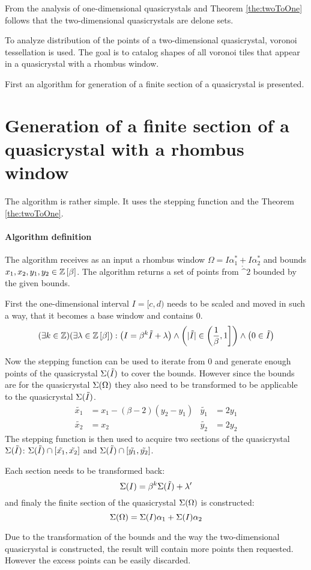 \documentclass[text.tex]{subfiles}
\begin{document}
From the analysis of one-dimensional quasicrystals and Theorem \ref{the:twoToOne} follows that the two-dimensional quasicrystals are delone sets.  

To analyze distribution of the points of a two-dimensional quasicrystal, voronoi tessellation is used. The goal is to catalog shapes of all voronoi tiles that appear in a quasicrystal with a rhombus window. 

First an algorithm for generation of a finite section of a quasicrystal is presented. 

\section{Generation of a finite section of a quasicrystal with a rhombus window}
The algorithm is rather simple. It uses the stepping function and the Theorem \ref{the:twoToOne}. 

\paragraph{Algorithm definition} The algorithm receives as an input a rhombus window $\Omega = I\alpha_1^\ast + I\alpha_2^\ast$ and bounds $x_1, x_2, y_1, y_2 \in \mathbb{Z}\left[\beta\right]$.
The algorithm returns a set of points from $\ring^2$ bounded by the given bounds.

First the one-dimensional interval $I = [c,d)$ needs to be scaled and moved in such a way, that it becomes a base window and contains $0$.
$$(\exists k\in\mathbb{Z})(\exists \lambda\in\mathbb{Z}\left[\beta\right]) : \left(I = \beta^k\tilde{I}+\lambda\right) \wedge \left(|\tilde{I}| \in \left(\frac{1}{\beta},1\right] \right)\wedge \left(0\in\tilde{I}\right)$$

Now the stepping function can be used to iterate from 0 and generate enough points of the quasicrystal $\Sigma(\tilde{I})$ to cover the bounds. However since the bounds are for the quasicrystal $\Sigma(\Omega)$ they also need to be transformed to be applicable to the quasicrystal $\Sigma(\tilde{I})$. 
\begin{align*}
\tilde{x_1} &= x_1 - (\beta-2)(y_2-y_1) & \tilde{y_1} &= 2y_1 \\
\tilde{x_2} &= x_2 & \tilde{y_2} &= 2y_2 
\end{align*}
The stepping function is then used to acquire two sections of the quasicrystal $\Sigma(\tilde{I})$: $\Sigma(\tilde{I})\cap[\tilde{x_1},\tilde{x_2}]$ and $\Sigma(\tilde{I})\cap[\tilde{y_1},\tilde{y_2}]$.

Each section needs to be transformed back:
$$\Sigma(I) = \beta^k\Sigma(\tilde{I}) + \lambda'$$
and finaly the finite section of the quasicrystal $\Sigma(\Omega)$ is constructed:
$$\Sigma(\Omega) = \Sigma(I)\alpha_1 + \Sigma(I)\alpha_2$$

\begin{remark}
Due to the transformation of the bounds and the way the two-dimensional quasicrystal is constructed, the result will contain more points then requested. However the excess points can be easily discarded.
\end{remark}
\end{document}
